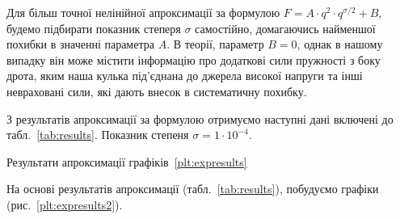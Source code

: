 \documentclass{LabWork}
\begin{document}
\ATable
{}\ATable

Для більш точної нелінійної апроксимації за формулою $F = A \cdot q^2 \cdot q^{\sigma/2} + B$, будемо підбирати показник степеря $\sigma$ самостійно, домагаючись найменшої похибки в значенні параметра $A$. В теорії, параметр $B = 0$, однак в нашому випадку він може містити інформацію про додаткові сили пружності з боку дрота, яким наша кулька під'єднана до джерела високої напруги та інші невраховані сили, які дають внесок в систематичну похибку.

З результатів апроксимації за формулою отримуємо наступні дані включені до табл.~\ref{tab:results}. Показник степеня $\sigma = 1 \cdot 10^{-4}$.

\begin{table}[ht!]\centering
\caption{Результати апроксимації графіків~\ref{plt:expresults}}
\label{tab:results}
\pgfplotstabletypeset[
    every head row/.style={
        before row={
        \toprule
        },
    after row=\midrule,
    },
    every last row/.style={
    after row=\bottomrule},
    columns={inva2, A, dA, s},
    columns/inva2/.style={
        column name={$1/a^2$, м$^{-2}$},
        sci zerofill,
        precision=0},
    columns/A/.style={
        fixed,fixed zerofill,
        multiply by=1e-12,
        column name={$A = F/q^2$, $10^{12}~$Н/Кл$^{2}$},
        precision=2},
    columns/dA/.style={
        column name={$\Delta(F/q^2)$, $10^{12}~$Н/Кл$^{2}$},
        fixed,fixed zerofill,
        multiply by=1e-12,
        precision=2},
    columns/s/.style={
        column name={$\sigma$},
        sci, sci zerofill,
        precision=0},
]\ATable
\end{table}

На основі результатів апроксимації (табл.~\ref{tab:results}), побудуємо графіки (рис.~\ref{plt:expresults2}).
\end{document}

